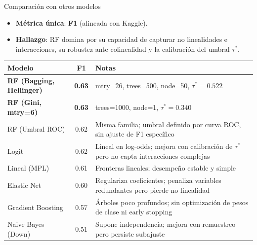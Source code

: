 \documentclass[10pt]{beamer}
\begin{document}
\begin{frame}{Comparación con otros modelos}
\small
\begin{itemize}
  \item \textbf{Métrica única}: \textbf{F1} (alineada con Kaggle).
  \item \textbf{Hallazgo}: RF domina por su capacidad de capturar no linealidades e interacciones, su robustez ante colinealidad y la calibración del umbral $\tau^{*}$.
\end{itemize}
\medskip
\small
\begin{tabularx}{\textwidth}{l c X}
\toprule
\textbf{Modelo} & \textbf{F1} & \textbf{Notas} \\
\midrule
\textbf{RF (Bagging, Hellinger)} & \textbf{0.63} & mtry=26, trees=500, node=50, $\tau^{*}=0.522$ \\
\textbf{RF (Gini, mtry=6)}       & \textbf{0.63} & trees=1000, node=1, $\tau^{*}=0.340$ \\
RF (Umbral ROC)         & 0.62 & Misma familia; umbral definido por curva ROC, sin ajuste de F1 específico \\
Logit                            & 0.62 & Lineal en log-odds; mejora con calibración de $\tau^{*}$ pero no capta interacciones complejas \\
Lineal (MPL)                     & 0.61 & Fronteras lineales; desempeño estable y simple \\
Elastic Net                      & 0.60 & Regulariza coeficientes; penaliza variables redundantes pero pierde no linealidad \\
Gradient Boosting                & 0.57 & Árboles poco profundos; sin optimización de pesos de clase ni early stopping \\
Naive Bayes (Down)               & 0.51 & Supone independencia; mejora con remuestreo pero persiste subajuste \\
\bottomrule
\end{tabularx}
\medskip

\end{frame}
\end{document}
